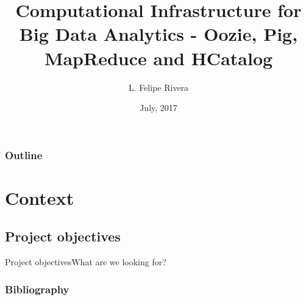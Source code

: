 \documentclass{beamer}
\title{Computational Infrastructure for Big Data Analytics - Oozie, Pig, MapReduce and HCatalog}
\author{L. Felipe Rivera}
\institute[Icesi University] %
{
 
  School of Engineering
  
}
\date{July, 2017}
\begin{document}
\begin{frame}
  \titlepage
\end{frame}

\begin{frame}[allowframebreaks]
\frametitle<presentation>{Outline}
  \tableofcontents
\end{frame}

\section{Context}

\subsection{Project objectives}

\begin{frame}{Project objectives}{What are we looking for?}



\end{frame}

\begin{frame}[allowframebreaks]
  \frametitle<presentation>{Bibliography}
    
  \begin{thebibliography}{10}


  
  

  \end{thebibliography}
\end{frame}
\end{document}
